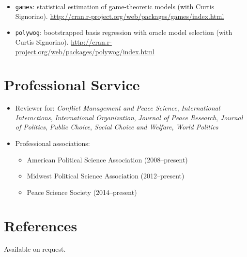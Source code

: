 \documentclass[11pt]{article}
\providecommand{\tightlist}{%
  \setlength{\itemsep}{0pt}\setlength{\parskip}{0pt}}
\begin{document}
\begin{itemize}
\item
  \texttt{games}: statistical estimation of game-theoretic models (with
  Curtis Signorino).
  \url{http://cran.r-project.org/web/packages/games/index.html}
\item
  \texttt{polywog}: bootstrapped basis regression with oracle model
  selection (with Curtis Signorino).
  \url{http://cran.r-project.org/web/packages/polywog/index.html}
\end{itemize}

\section{Professional Service}\label{professional-service}

\begin{itemize}
\item
  Reviewer for: \emph{Conflict Management and Peace Science},
  \emph{International Interactions}, \emph{International Organization},
  \emph{Journal of Peace Research}, \emph{Journal of Politics},
  \emph{Public Choice}, \emph{Social Choice and Welfare}, \emph{World
  Politics}
\item
  Professional associations:

  \begin{itemize}
  \tightlist
  \item
    American Political Science Association (2008--present)
  \item
    Midwest Political Science Association (2012--present)
  \item
    Peace Science Society (2014--present)
  \end{itemize}
\end{itemize}

\section{References}\label{references}

Available on request.
\end{document}
